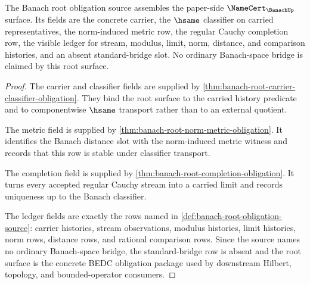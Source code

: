 \begin{theorem}
\label{thm:banach-root-namecert-surface}
The Banach root obligation source assembles the paper-side
$\NameCert_{\BanachUp}$ surface. Its fields are the concrete carrier,
the $\hsame$ classifier on carried representatives, the norm-induced metric
row, the regular Cauchy completion row, the visible ledger for stream,
modulus, limit, norm, distance, and comparison histories, and an absent
standard-bridge slot. No ordinary Banach-space bridge is claimed by this root
surface.
\end{theorem}
\begin{proof}
The carrier and classifier fields are supplied by
\autoref{thm:banach-root-carrier-classifier-obligation}. They bind the root
surface to the carried history predicate and to componentwise $\hsame$
transport rather than to an external quotient.

The metric field is supplied by
\autoref{thm:banach-root-norm-metric-obligation}. It identifies the Banach
distance slot with the norm-induced metric witness and records that this row
is stable under classifier transport.

The completion field is supplied by
\autoref{thm:banach-root-completion-obligation}. It turns every accepted
regular Cauchy stream into a carried limit and records uniqueness up to the
Banach classifier.

The ledger fields are exactly the rows named in
\autoref{def:banach-root-obligation-source}: carrier histories, stream
observations, modulus histories, limit histories, norm rows, distance rows,
and rational comparison rows. Since the source names no ordinary
Banach-space bridge, the standard-bridge row is absent and the root surface is
the concrete BEDC obligation package used by downstream Hilbert, topology, and
bounded-operator consumers.
\end{proof}

